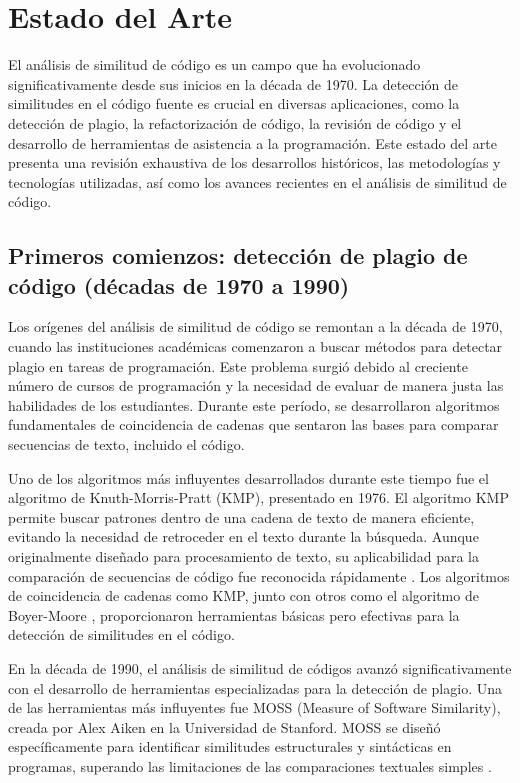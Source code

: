 \chapter{Estado del Arte}\label{chapter:state-of-the-art}
El análisis de similitud de código es un campo que ha evolucionado significativamente desde sus inicios en la década de 1970. La detección de similitudes en el código fuente es crucial en diversas aplicaciones, como la detección de plagio, la refactorización de código, la revisión de código y el desarrollo de herramientas de asistencia a la programación. Este estado del arte presenta una revisión exhaustiva de los desarrollos históricos, las metodologías y tecnologías utilizadas, así como los avances recientes en el análisis de similitud de código.

\section*{\textbf{Primeros comienzos: detección de plagio de código (décadas de 1970 a 1990)}}  
Los orígenes del análisis de similitud de código se remontan a la década de 1970, cuando las instituciones académicas comenzaron a buscar métodos para detectar plagio en tareas de programación. Este problema surgió debido al creciente número de cursos de programación y la necesidad de evaluar de manera justa las habilidades de los estudiantes. Durante este período, se desarrollaron algoritmos fundamentales de coincidencia de cadenas que sentaron las bases para comparar secuencias de texto, incluido el código.

Uno de los algoritmos más influyentes desarrollados durante este tiempo fue el algoritmo de Knuth-Morris-Pratt (KMP), presentado en 1976. El algoritmo KMP permite buscar patrones dentro de una cadena de texto de manera eficiente, evitando la necesidad de retroceder en el texto durante la búsqueda. Aunque originalmente diseñado para procesamiento de texto, su aplicabilidad para la comparación de secuencias de código fue reconocida rápidamente \cite{knuth1977fast}. Los algoritmos de coincidencia de cadenas como KMP, junto con otros como el algoritmo de Boyer-Moore \cite{boyer1977fast}, proporcionaron herramientas básicas pero efectivas para la detección de similitudes en el código.

En la década de 1990, el análisis de similitud de códigos avanzó significativamente con el desarrollo de herramientas especializadas para la detección de plagio. Una de las herramientas más influyentes fue MOSS (Measure of Software Similarity), creada por Alex Aiken en la Universidad de Stanford. MOSS se diseñó específicamente para identificar similitudes estructurales y sintácticas en programas, superando las limitaciones de las comparaciones textuales simples \cite{aiken1994moss}.

